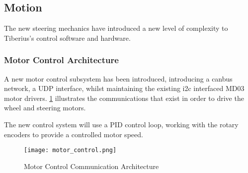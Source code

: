 \subsection{Motion}

The new steering mechanics have introduced a new level of complexity to Tiberius's control software and hardware.

\subsubsection{Motor Control Architecture}
A new motor control subsystem has been introduced, introducing a \gls{canbus} network, a \gls{UDP} interface, whilst maintaining the existing \gls{i2c} interfaced MD03 motor drivers. \ref{fig:motor-control-architecture} illustrates the communications that exist in order to drive the wheel and steering motors.

The new control system will use a PID control loop, working with the rotary encoders to provide a controlled motor speed.

\begin{figure}[!htb]
\begin{center}
\texttt{[image: motor\_control.png]}
\end{center}
\caption{Motor Control Communication Architecture}
\label{fig:motor-control-architecture}
\end{figure}